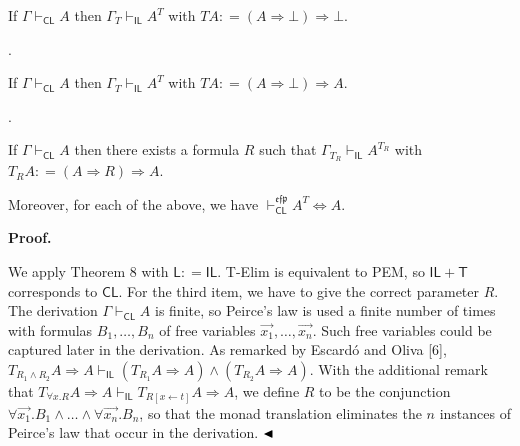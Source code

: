 \documentclass[10pt,a4paper]{article}
\begin{document}
If $\Gamma\vdash_{\mathsf{CL}}A$ then $\Gamma_{T}\vdash_{\mathsf{IL}}A^{T}$ with $TA\mathrel{\mathop{:}}=(A\mathbin{\Rightarrow}\bot)\mathbin{\Rightarrow}\bot$.\par
 
 
 
\par{}. 
 
If $\Gamma\vdash_{\mathsf{CL}}A$ then $\Gamma_{T}\vdash_{\mathsf{IL}}A^{T}$ with $TA\mathrel{\mathop{:}}=(A\mathbin{\Rightarrow}\bot)\mathbin{\Rightarrow}A$.\par
 
 
 
\par{}. 
 
If $\Gamma\vdash_{\mathsf{CL}}A$ then there exists a formula $R$ such that $\Gamma_{T_{R}}\vdash_{\mathsf{IL}}A^{T_{R}}$ with $T_{R}A\mathrel{\mathop{:}}=(A\mathbin{\Rightarrow}R)\mathbin{\Rightarrow}A$.\par
 
 
  
Moreover, for each of the above, we have $\vdash_{\mathsf{CL}}^{\mathfrak{e}\mathfrak{f}\mathfrak{p}}A^{T}\Leftrightarrow
A$.\par
 
 
 
 
\par\medskip\noindent\textbf{Proof.}\par
 
 
We apply Theorem 8 with $\mathsf{L}\mathrel{\mathop{:}}=\mathsf{IL}$. T-Elim is equivalent to PEM, so $\mathsf{IL}+\mathsf{T}$ corresponds to $\mathsf{CL}$. For the third item, we have to give the correct parameter $R$. The derivation $\Gamma\vdash_{\mathsf{CL}}A$ is finite, so Peirce’s law is used a finite number of times with formulas $B_{1},\ldots,B_{n}$ of free variables $\vec{x_{1}},\ldots,\vec{x_{n}}$. Such free variables could be captured later in the derivation. As remarked by Escardó and Oliva [6], $T_{R_{1}\mathbin{\wedge}R_{2}}A\mathbin{\Rightarrow}A\vdash_{\mathsf{IL}}(T_{R_{1}}A\mathbin{\Rightarrow}A)\mathbin{\wedge}(T_{R_{2}}A\mathbin{\Rightarrow}A)$. With the additional remark that $T_{{\forall}x.R}A\mathbin{\Rightarrow}A\vdash_{\mathsf{IL}}T_{R[x\leftarrow t]}A\mathbin{\Rightarrow}A$, we define $R$ to be the conjunction ${\forall}\vec{x_{1}}.B_{1}\mathbin{\wedge}\ldots\mathbin{\wedge}{\forall}\vec{x_{n}}.B_{n}$, so that the monad translation eliminates the $n$ instances of Peirce’s law that occur in the derivation. $\hfill\blacktriangleleft$\par
 
\end{document}
